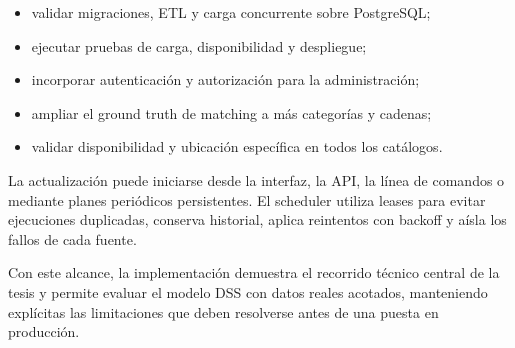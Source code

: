 \begin{itemize}
    \item validar migraciones, ETL y carga concurrente sobre PostgreSQL;
    \item ejecutar pruebas de carga, disponibilidad y despliegue;
    \item incorporar autenticación y autorización para la administración;
    \item ampliar el ground truth de matching a más categorías y cadenas;
    \item validar disponibilidad y ubicación específica en todos los catálogos.
\end{itemize}

La actualización puede iniciarse desde la interfaz, la API, la línea de comandos
o mediante planes periódicos persistentes. El scheduler utiliza leases para evitar
ejecuciones duplicadas, conserva historial, aplica reintentos con backoff y aísla
los fallos de cada fuente.

Con este alcance, la implementación demuestra el recorrido técnico central de la
tesis y permite evaluar el modelo DSS con datos reales acotados, manteniendo
explícitas las limitaciones que deben resolverse antes de una puesta en producción.
